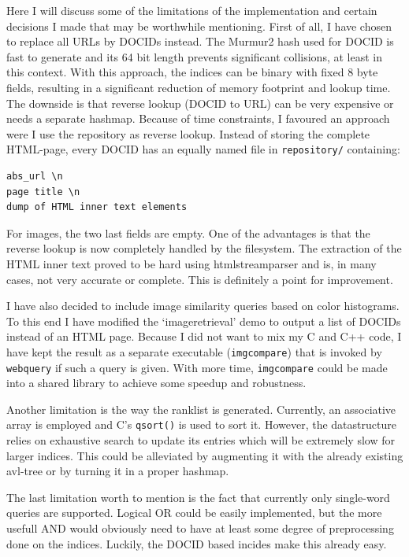 \documentclass[10pt,a4paper]{article}
\begin{document}
Here I will discuss some of the limitations of the implementation and certain decisions I made that may be worthwhile mentioning. First of all, I have chosen to replace all URLs by DOCIDs instead. The Murmur2 hash used for DOCID is fast to generate and its 64 bit length prevents significant collisions, at least in this context. With this approach, the indices can be binary with fixed 8 byte fields, resulting in a significant reduction of memory footprint and lookup time. The downside is that reverse lookup (DOCID to URL) can be very expensive or needs a separate hashmap. Because of time constraints, I favoured an approach were I use the repository as reverse lookup. Instead of storing the complete HTML-page, every DOCID has an equally named file in \texttt{repository/} containing:
\begin{verbatim}
abs_url \n
page title \n
dump of HTML inner text elements
\end{verbatim}
For images, the two last fields are empty. One of the advantages is that the reverse lookup is now completely handled by the filesystem. The extraction of the HTML inner text proved to be hard using htmlstreamparser and is, in many cases, not very accurate or complete. This is definitely a point for improvement.\par
I have also decided to include image similarity queries based on color histograms. To this end I have modified the `imageretrieval' demo to output a list of DOCIDs instead of an HTML page. Because I did not want to mix my C and C++ code, I have kept the result as a separate executable (\texttt{imgcompare}) that is invoked by \texttt{webquery} if such a query is given. With more time, \texttt{imgcompare} could be made into a shared library to achieve some speedup and robustness.\par
Another limitation is the way the ranklist is generated. Currently, an associative array is employed and C's \texttt{qsort()} is used to sort it. However, the datastructure relies on exhaustive search to update its entries which will be extremely slow for larger indices. This could be alleviated by augmenting it with the already existing avl-tree or by turning it in a proper hashmap.\par
The last limitation worth to mention is the fact that currently only single-word queries are supported. Logical OR could be easily implemented, but the more usefull AND would obviously need to have at least some degree of preprocessing done on the indices. Luckily, the DOCID based incides make this already easy.
\end{document}
